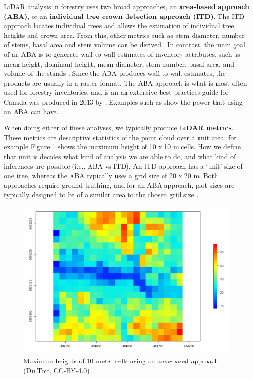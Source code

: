 \documentclass[
]{book}
\begin{document}
LiDAR analysis in forestry uses two broad approaches, an \textbf{area-based approach (ABA)}, or an \textbf{individual tree crown detection approach (ITD)}. The ITD approach locates individual trees and allows the estimation of individual tree heights and crown area. From this, other metrics such as stem diameter, number of stems, basal area and stem volume can be derived \citep{hyyppa_detecting_1999}. In contrast, the main goal of an ABA is to generate wall-to-wall estimates of inventory attributes, such as mean height, dominant height, mean diameter, stem number, basal area, and volume of the stands \citep{naesset_predicting_2002}. Since the ABA produces wall-to-wall estimates, the products are usually in a raster format. The ABA approach is what is most often used for forestry inventories, and is an an extensive best practices guide for Canada was produced in 2013 by \citet{white_best_2013}. Examples such as \citet{tompalski_demonstrating_2019} show the power that using an ABA can have.

When doing either of these analyses, we typically produce \textbf{LiDAR metrics}. These metrics are descriptive statistics of the point cloud over a unit area; for example Figure \ref{fig:15-las-hmax-2D} shows the maximum height of 10 x 10 m cells. How we define that unit is decides what kind of analysis we are able to do, and what kind of inferences are possible (i.e., ABA vs ITD). An ITD approach has a `unit' size of one tree, whereas the ABA typically uses a grid size of 20 x 20 m. Both approaches require ground truthing, and for an ABA approach, plot sizes are typically designed to be of a similar area to the chosen grid size \citep{white_best_2013}.

\begin{figure}
\includegraphics[width=0.7\linewidth]{images/15-las-hmax-2D} \caption{Maximum heights of 10 meter cells using an area-based approach. (Du Toit, CC-BY-4.0).}\label{fig:15-las-hmax-2D}
\end{figure}
\end{document}
